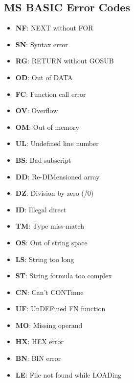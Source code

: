\documentclass[a4paper,11pt]{article}
\begin{document}
    \subsection{MS BASIC  Error Codes}

    \begin{itemize}
        \item \textbf{NF}: NEXT without FOR
        \item \textbf{SN}: Syntax error
        \item \textbf{RG}: RETURN without GOSUB
        \item \textbf{OD}: Out of DATA
        \item \textbf{FC}: Function call error
        \item \textbf{OV}: Overflow
        \item \textbf{OM}: Out of memory
        \item \textbf{UL}: Undefined line number
        \item \textbf{BS}: Bad subscript
        \item \textbf{DD}: Re-DIMensioned array
        \item \textbf{DZ}: Division by zero (/0)
        \item \textbf{ID}: Illegal direct
        \item \textbf{TM}: Type miss-match
        \item \textbf{OS}: Out of string space
        \item \textbf{LS}: String too long
        \item \textbf{ST}: String formula too complex
        \item \textbf{CN}: Can't CONTinue
        \item \textbf{UF}: UnDEFined FN function
        \item \textbf{MO}: Missing operand
        \item \textbf{HX}: HEX error
        \item \textbf{BN}: BIN error
        \item \textbf{LE}: File not found while LOADing
    \end{itemize}

    \pagebreak
    
    
\end{document}
